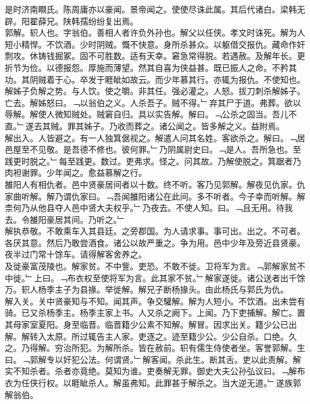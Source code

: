\documentclass{zhvt-classic}
\begin{document}
\hspace*{2em}是时济南瞷氏。陈周庸亦以豪闻。景帝闻之。使使尽诛此属。其后代诸白。梁韩无辟。阳翟薛兄。陕韩孺纷纷复出焉。\\
\hspace*{2em}郭解。轵人也。字翁伯。善相人者许负外孙也。解父以任侠。孝文时诛死。解为人短小精悍。不饮酒。少时阴贼。慨不快意。身所杀甚众。以躯借交报仇。藏命作奸剽攻。休铸钱掘冢。固不可胜数。适有天幸。窘急常得脱。若遇赦。及解年长。更折节为俭。以德报怨。厚施而薄望。然其自喜为侠益甚。既已振人之命。不矜其功。其阴贼着于心。卒发于睚眦如故云。而少年慕其行。亦辄为报仇。不使知也。解姊子负解之势。与人饮。使之嚼。非其任。强必灌之。人怒。拔刀刺杀解姊子。亡去。解姊怒曰。﹁以翁伯之义。人杀吾子。贼不得。﹂弃其尸于道。弗葬。欲以辱解。解使人微知贼处。贼窘自归。具以实告解。解曰。﹁公杀之固当。吾儿不直。﹂遂去其贼。罪其姊子。乃收而葬之。诸公闻之。皆多解之义。益附焉。\\
\hspace*{2em}解出入。人皆避之。有一人独箕倨视之。解遣人问其名姓。客欲杀之。解曰。﹁居邑屋至不见敬。是吾德不修也。彼何罪。﹂乃阴属尉史曰。﹁是人。吾所急也。至践更时脱之。﹂每至践更。数过。吏弗求。怪之。问其故。乃解使脱之。箕踞者乃肉袒谢罪。少年闻之。愈益慕解之行。\\
\hspace*{2em}雒阳人有相仇者。邑中贤豪居间者以十数。终不听。客乃见郭解。解夜见仇家。仇家曲听解。解乃谓仇家曰。﹁吾闻雒阳诸公在此间。多不听者。今子幸而听解。解柰何乃从他县夺人邑中贤大夫权乎。﹂乃夜去。不使人知。曰。﹁且无用。待我去。令雒阳豪居其间。乃听之。﹂\\
\hspace*{2em}解执恭敬。不敢乘车入其县廷。之旁郡国。为人请求事。事可出。出之。不可者。各厌其意。然后乃敢尝酒食。诸公以故严重之。争为用。邑中少年及旁近县贤豪。夜半过门常十馀车。请得解客舍养之。\\
\hspace*{2em}及徙豪富茂陵也。解家贫。不中訾。吏恐。不敢不徙。卫将军为言。﹁郭解家贫不中徙。﹂上曰。﹁布衣权至使将军为言。此其家不贫。﹂解家遂徙。诸公送者出千馀万。轵人杨季主子为县掾。举徙解。解兄子断杨掾头。由此杨氏与郭氏为仇。\\
\hspace*{2em}解入关。关中贤豪知与不知。闻其声。争交驩解。解为人短小。不饮酒。出未尝有骑。已又杀杨季主。杨季主家上书。人又杀之阙下。上闻。乃下吏捕解。解亡。置其母家室夏阳。身至临晋。临晋籍少公素不知解。解冒。因求出关。籍少公已出解。解转入太原。所过辄告主人家。吏逐之。迹至籍少公。少公自杀。口绝。久之。乃得解。穷治所犯。为解所杀。皆在赦前。轵有儒生侍使者坐。客誉郭解。生曰。﹁郭解专以奸犯公法。何谓贤。﹂解客闻。杀此生。断其舌。吏以此责解。解实不知杀者。杀者亦竟绝。莫知为谁。吏奏解无罪。御史大夫公孙弘议曰。﹁解布衣为任侠行权。以睚眦杀人。解虽弗知。此罪甚于解杀之。当大逆无道。﹂遂族郭解翁伯。\\
\end{document}
